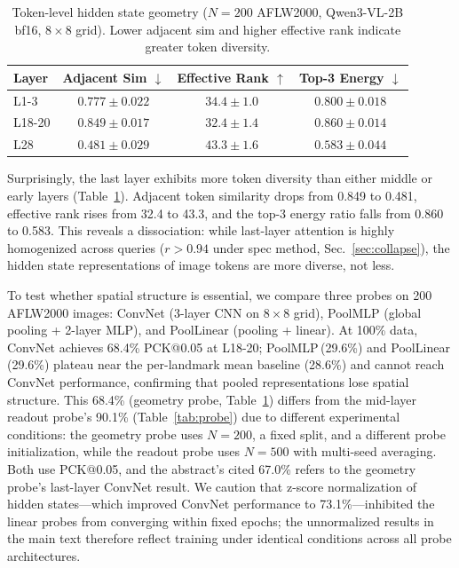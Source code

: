 \documentclass[10pt,twocolumn,letterpaper]{article}
\begin{document}
\begin{table}[t]
\centering
\small
\caption{Token-level hidden state geometry ($N=200$ AFLW2000, Qwen3-VL-2B bf16, $8\times8$ grid). Lower adjacent sim and higher effective rank indicate greater token diversity.}
\label{tab:geometry}
\setlength{\tabcolsep}{3pt}
\begin{tabular}{lccc}
\toprule
Layer & Adjacent Sim $\downarrow$ & Effective Rank $\uparrow$ & Top-3 Energy $\downarrow$ \\
\midrule
L1-3 & $0.777\pm0.022$ & $34.4\pm1.0$ & $0.800\pm0.018$ \\
L18-20 & $0.849\pm0.017$ & $32.4\pm1.4$ & $0.860\pm0.014$ \\
L28 & $0.481\pm0.029$ & $43.3\pm1.6$ & $0.583\pm0.044$ \\
\bottomrule
\end{tabular}
\end{table}

Surprisingly, the last layer exhibits more token diversity than either middle or early layers (Table~\ref{tab:geometry}). Adjacent token similarity drops from 0.849 to 0.481, effective rank rises from 32.4 to 43.3, and the top-3 energy ratio falls from 0.860 to 0.583. This reveals a dissociation: while last-layer attention is highly homogenized across queries ($r>0.94$ under spec method, Sec.~\ref{sec:collapse}), the hidden state representations of image tokens are more diverse, not less.

To test whether spatial structure is essential, we compare three probes on 200 AFLW2000 images: ConvNet (3-layer CNN on $8\times8$ grid), PoolMLP (global pooling + 2-layer MLP), and PoolLinear (pooling + linear). At 100\% data, ConvNet achieves 68.4\% PCK@0.05 at L18-20; PoolMLP\,(29.6\%) and PoolLinear\,(29.6\%) plateau near the per-landmark mean baseline (28.6\%) and cannot reach ConvNet performance, confirming that pooled representations lose spatial structure. This 68.4\% (geometry probe, Table~\ref{tab:geometry}) differs from the mid-layer readout probe's 90.1\% (Table~\ref{tab:probe}) due to different experimental conditions: the geometry probe uses $N=200$, a fixed split, and a different probe initialization, while the readout probe uses $N=500$ with multi-seed averaging. Both use PCK@0.05, and the abstract's cited 67.0\% refers to the geometry probe's last-layer ConvNet result. We caution that z-score normalization of hidden states---which improved ConvNet performance to 73.1\%---inhibited the linear probes from converging within fixed epochs; the unnormalized results in the main text therefore reflect training under identical conditions across all probe architectures.
\end{document}
